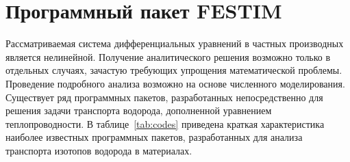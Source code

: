 
\section{Программный пакет FESTIM}\label{sec:ch2/sec2}

Рассматриваемая система дифференциальных уравнений в частных производных является нелинейной. Получение аналитического решения возможно только в отдельных случаях, зачастую требующих упрощения математической проблемы. Проведение подробного анализа возможно на основе численного моделирования. Существует ряд программных пакетов, разработанных непосредственно для решения задачи транспорта водорода, дополненной уравнением теплопроводности. В таблице~\cref{tab:codes} приведена краткая характеристика наиболее известных программных пакетов, разработанных для анализа транспорта изотопов водорода в материалах.
